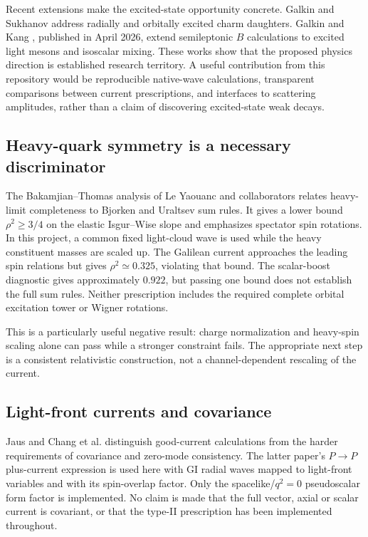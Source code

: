 \documentclass[11pt,a4paper]{article}
\begin{document}
Recent extensions make the excited-state opportunity concrete. Galkin and Sukhanov \cite{galkin2025} address radially and orbitally excited charm daughters. Galkin and Kang \cite{galkin2026}, published in April 2026, extend semileptonic $B$ calculations to excited light mesons and isoscalar mixing. These works show that the proposed physics direction is established research territory. A useful contribution from this repository would be reproducible native-wave calculations, transparent comparisons between current prescriptions, and interfaces to scattering amplitudes, rather than a claim of discovering excited-state weak decays.

\subsection{Heavy-quark symmetry is a necessary discriminator}
The Bakamjian--Thomas analysis of Le Yaouanc and collaborators \cite{bt} relates heavy-limit completeness to Bjorken and Uraltsev sum rules. It gives a lower bound $\rho^2\geq3/4$ on the elastic Isgur--Wise slope and emphasizes spectator spin rotations. In this project, a common fixed light-cloud wave is used while the heavy constituent masses are scaled up. The Galilean current approaches the leading spin relations but gives $\rho^2\simeq0.325$, violating that bound. The scalar-boost diagnostic gives approximately $0.922$, but passing one bound does not establish the full sum rules. Neither prescription includes the required complete orbital excitation tower or Wigner rotations.

This is a particularly useful negative result: charge normalization and heavy-spin scaling alone can pass while a stronger constraint fails. The appropriate next step is a consistent relativistic construction, not a channel-dependent rescaling of the current.

\subsection{Light-front currents and covariance}
Jaus \cite{jaus} and Chang et al. \cite{chang} distinguish good-current calculations from the harder requirements of covariance and zero-mode consistency. The latter paper's $P\to P$ plus-current expression is used here with GI radial waves mapped to light-front variables and with its spin-overlap factor. Only the spacelike/$q^2=0$ pseudoscalar form factor is implemented. No claim is made that the full vector, axial or scalar current is covariant, or that the type-II prescription has been implemented throughout.
\end{document}
